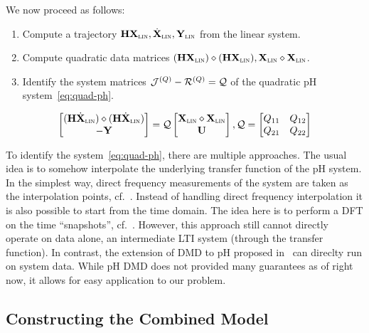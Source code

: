 We now proceed as follows:
\begin{enumerate}
    \item Compute a trajectory $\mathbf{H} \mathbf{X}_{\textsc{lin}}, \dot{\mathbf{X}}_{\textsc{lin}}, \mathbf{Y}_{\textsc{lin}}$ from the linear system.
    \item Compute quadratic data matrices $(\mathbf{H} \mathbf{X}_{\textsc{lin}}) \diamond (\mathbf{H} \mathbf{X}_{\textsc{lin}}), \mathbf{X}_{\textsc{lin}} \diamond \mathbf{X}_{\textsc{lin}}$.
    \item Identify the system matrices $\mathcal{J}^{(Q)} - \mathcal{R}^{(Q)} = \mathcal{Q}$ of the quadratic pH system~\eqref{eq:quad-ph}.
\end{enumerate}

\begin{equation}\label{eq:quad-ph}
    \begin{bmatrix}
        (\mathbf{H} \dot{\mathbf{X}}_{\textsc{lin}}) \diamond (\mathbf{H} \dot{\mathbf{X}}_{\textsc{lin}}) \\
        - \mathbf{Y}
    \end{bmatrix} = \mathcal{Q} \begin{bmatrix}
        \mathbf{X}_{\textsc{lin}} \diamond \mathbf{X}_{\textsc{lin}} \\
        \mathbf{U}
    \end{bmatrix}, \mathcal{Q} = \begin{bmatrix}
        Q_{11} & Q_{12} \\
        Q_{21} & Q_{22}
    \end{bmatrix}
\end{equation}

To identify the system~\eqref{eq:quad-ph}, there are multiple approaches.
The usual idea is to somehow interpolate the underlying transfer function of the pH system.
In the simplest way, direct frequency measurements of the system are taken as the interpolation points, cf.~\cite{Gillis2018, Cherifi2019, Benner2020, Schwerdtner2021}.
Instead of handling direct frequency interpolation it is also possible to start from the time domain.
The idea here is to perform a DFT on the time ``snapshots'', cf.~\cite{Peherstorfer2017, Cherifi2021, Cherifi2022}.
However, this approach still cannot directly operate on data alone, an intermediate LTI system (through the transfer function).
In contrast, the extension of DMD to pH proposed in~\cite{Morandin2022} can direclty run on system data.
While pH DMD does not provided many guarantees as of right now, it allows for easy application to our problem.

\subsection{Constructing the Combined Model}


